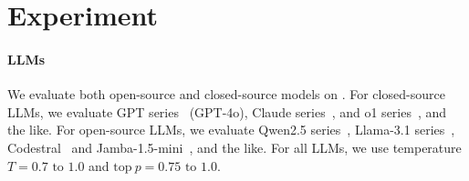 \section{Experiment}
\label{sec:experiment}


\begin{table}[h]
    \centering
    \caption{\textbf{Statistics of our Benchmarks}: Avg. Len refers to the total number of characters in each question with 0-, 5-, or 10-word encoding numbers, respectively. Answer Format includes the following types: ME (Mathematical Expression), SC (Single Choice), CB (Code Blocks), TE (Textual Expression), and MC (Multiple Choices).}
    \label{tab:benchmark_statistics}
    \vskip 0.15in
    \vskip -0.1in
\end{table}

\paragraph{LLMs}
We evaluate both open-source and closed-source models on \benchmark{}. For closed-source LLMs, we evaluate GPT series~\citep{gpt4} (GPT-4o), Claude series~\citep{claude35addendum}, and o1 series~\citep{openaiO1}, and the like. 
For open-source LLMs, we evaluate Qwen2.5 series~\citep{qwen2.5}, Llama-3.1 series~\citep{llama3}, Codestral~\citep{mistral} and Jamba-1.5-mini~\citep{Jamba}, and the like.
For all LLMs, we use temperature $T=0.7 \text{ to } 1.0$ and $\text{top}\ p=0.75 \text{ to } 1.0$.

